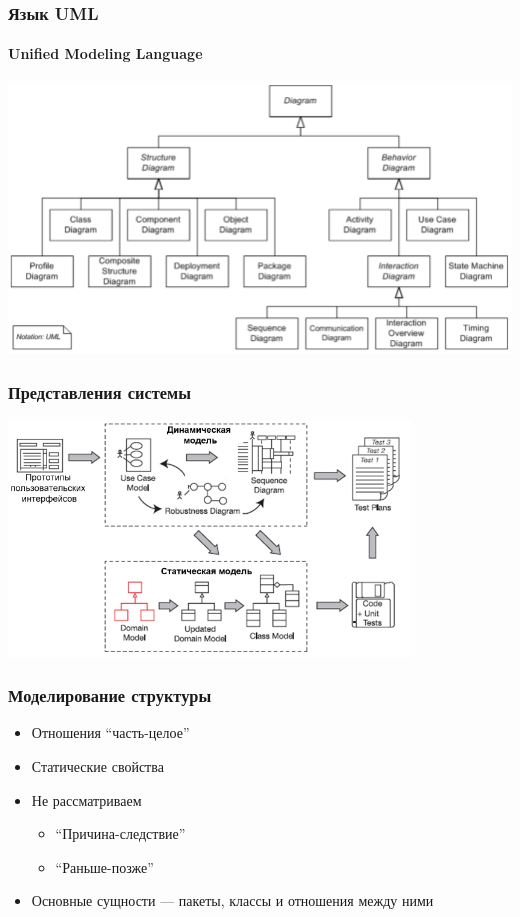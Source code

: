 \documentclass[xetex,mathserif,serif]{beamer}
\begin{document}
	\begin{frame}
		\frametitle{Язык UML}
		\framesubtitle{Unified Modeling Language}
		\begin{center}
			\includegraphics[width=\textwidth]{umlDiagrams.png}
		\end{center}
	\end{frame}

	\begin{frame}
		\frametitle{Представления системы}
		\begin{center}
			\includegraphics[width=0.8\textwidth]{modelTypes.png}
		\end{center}
	\end{frame}

	\begin{frame}
		\frametitle{Моделирование структуры}
		\begin{itemize}
			\item Отношения ``часть-целое''
			\item Статические свойства
			\item Не рассматриваем
			\begin{itemize}
				\item ``Причина-следствие''
				\item ``Раньше-позже''
			\end{itemize}
			\item Основные сущности --- пакеты, классы и отношения между ними
		\end{itemize}
	\end{frame}
\end{document}
